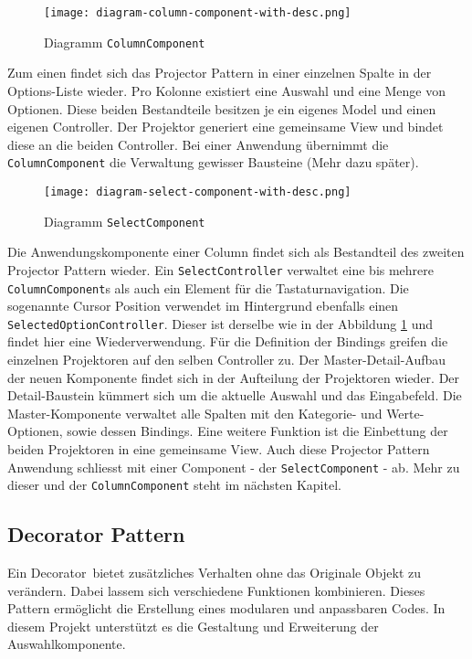 \begin{figure}[!htb] %
    \centering
    \texttt{[image: diagram-column-component-with-desc.png]}
    \caption{Diagramm \texttt{ColumnComponent}}
    \label{img:diagramColumnComponent}
\end{figure}

Zum einen findet sich das Projector Pattern in einer einzelnen Spalte in der Options-Liste wieder.
Pro Kolonne existiert eine Auswahl und eine Menge von Optionen.
Diese beiden Bestandteile besitzen je ein eigenes Model und einen eigenen Controller.
Der Projektor generiert eine gemeinsame View und bindet diese an die beiden Controller.
Bei einer Anwendung übernimmt die \texttt{ColumnComponent} die Verwaltung gewisser Bausteine (Mehr dazu später).

\begin{figure}[!htb]
    \centering
    \texttt{[image: diagram-select-component-with-desc.png]}
    \caption{Diagramm \texttt{SelectComponent}}
    \label{img:diagramSelectComponent}
\end{figure}

Die Anwendungskomponente einer Column findet sich als Bestandteil des zweiten Projector Pattern wieder.
Ein \texttt{SelectController} verwaltet eine bis mehrere \texttt{ColumnComponent}s als auch ein Element für die Tastaturnavigation.
Die sogenannte Cursor Position verwendet im Hintergrund ebenfalls einen \texttt{SelectedOptionController}. 
Dieser ist derselbe wie in der Abbildung \ref{img:diagramColumnComponent} und findet hier eine Wiederverwendung.
Für die Definition der Bindings greifen die einzelnen Projektoren auf den selben Controller zu.
Der Master-Detail-Aufbau der neuen Komponente findet sich in der Aufteilung der Projektoren wieder.
Der Detail-Baustein kümmert sich um die aktuelle Auswahl und das Eingabefeld.
Die Master-Komponente verwaltet alle Spalten mit den Kategorie- und Werte-Optionen, sowie dessen Bindings.
Eine weitere Funktion ist die Einbettung der beiden Projektoren in eine gemeinsame View.
Auch diese Projector Pattern Anwendung schliesst mit einer Component - der \texttt{SelectComponent} - ab.
Mehr zu dieser und der \texttt{ColumnComponent} steht im nächsten Kapitel.


\subsection{Decorator Pattern}
\label{sec:decoratorPattern}

Ein Decorator\footnotemark \ bietet zusätzliches Verhalten ohne das Originale Objekt zu verändern.
Dabei lassem sich verschiedene Funktionen kombinieren.
Dieses Pattern ermöglicht die Erstellung eines modularen und anpassbaren Codes.
In diesem Projekt unterstützt es die Gestaltung und Erweiterung der Auswahlkomponente.

